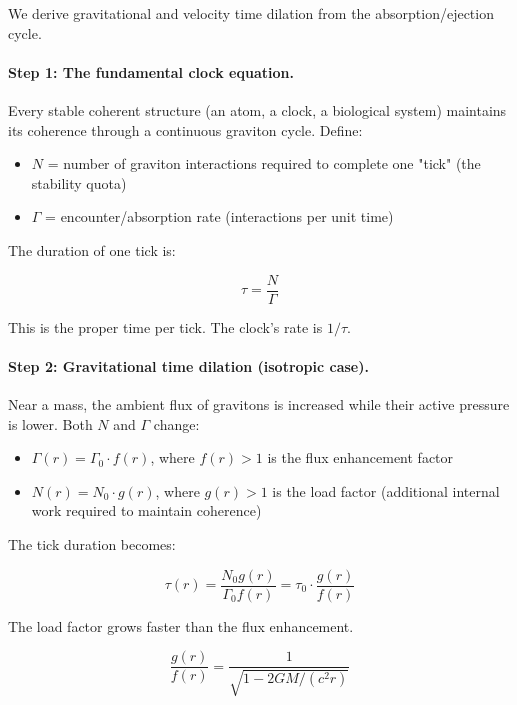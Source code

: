\documentclass[12pt, a4paper]{article}
\begin{document}
We derive gravitational and velocity time dilation from the absorption/ejection cycle.

\paragraph{Step 1: The fundamental clock equation.}

Every stable coherent structure (an atom, a clock, a biological system) maintains its coherence through a continuous graviton cycle. Define:
\begin{itemize}
    \item \( N \) = number of graviton interactions required to complete one "tick" (the stability quota)
    \item \( \Gamma \) = encounter/absorption rate (interactions per unit time)
\end{itemize}

The duration of one tick is:

\[
\tau = \frac{N}{\Gamma}
\]

This is the proper time per tick. The clock's rate is \( 1/\tau \).

\paragraph{Step 2: Gravitational time dilation (isotropic case).}

Near a mass, the ambient flux of gravitons is increased while their active pressure is lower. Both \( N \) and \( \Gamma \) change:
\begin{itemize}
    \item \( \Gamma(r) = \Gamma_0 \cdot f(r) \), where \( f(r) > 1 \) is the flux enhancement factor
    \item \( N(r) = N_0 \cdot g(r) \), where \( g(r) > 1 \) is the load factor (additional internal work required to maintain coherence)
\end{itemize}

The tick duration becomes:

\[
\tau(r) = \frac{N_0 g(r)}{\Gamma_0 f(r)} = \tau_0 \cdot \frac{g(r)}{f(r)}
\]

The load factor grows faster than the flux enhancement. 

\[
\frac{g(r)}{f(r)} = \frac{1}{\sqrt{1 - 2GM/(c^2 r)}}
\]
\end{document}

